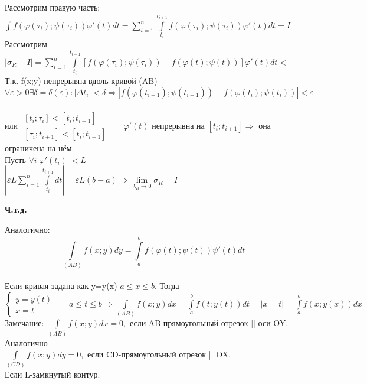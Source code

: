 \documentclass[12pt]{article}
\let\oldint\int
\let\oldsum\sum
\let\oldlim\lim
\renewcommand{\int}{\oldint\limits}
\renewcommand{\sum}{\oldsum\limits}
\renewcommand{\lim}{\oldlim\limits}
\begin{document}
  Рассмотрим правую часть: $\int f(\varphi(\tau_i);\psi(\tau_i))\varphi'(t)dt = \sum_{i=1}^{n}
    \int_{t_i}^{t_{i+1}}f(\varphi(\tau_i);\psi(\tau_i))\varphi'(t)dt=I$\\
  Рассмотрим $|\sigma_R-I|=\sum_{i=1}^{n} \int_{t_i}^{t_{i+1}} [f(\varphi(\tau_i);\psi(\tau_i))-
  f(\varphi(t);\psi(t))]\varphi'(t)dt \boxed{<}$\\
  Т.к. f(x;y) непрерывна вдоль кривой (AB)\\
  \[\forall \varepsilon >0 \exists \delta = \delta(\varepsilon):|\Delta t_i| < \delta \Rightarrow
  |f(\varphi(t_{i+1});\psi(t_{i+1}))-f(\varphi(t_i);\psi(t_i))|<\varepsilon\]\\
  или $\begin{matrix}
    [t_i;\tau_i] <[t_i;t_{i+1}]\\
    [\tau_i;t_{i+1}] < [t_i;t_{i+1}]
  \end{matrix} \hspace{20pt} \varphi'(t)$ непрерывна на $[t_i;t_{i+1}] \Rightarrow$ она ограничена на нём.\\
  Пусть $\forall i |\varphi'(t_i)|<L$\\
  \boxed{<} $|\varepsilon L \sum_{i=1}^{n} \int_{t_i}^{t_{i+1}}dt|=\varepsilon L(b-a)\Rightarrow \lim_{\lambda_R \to 0}\sigma_R=I$
  \begin{center}
    \textbf{Ч.т.д.}
  \end{center}
  Аналогично: \[\int_{(AB)}f(x;y)dy=\int_{a}^{b}f(\varphi(t);\psi(t))\psi'(t)dt\]\\
  Если кривая задана как y=y(x) \hspace{10pt} $a\leq x\leq b$. Тогда\\
  $\begin{cases}
    y=y(t)\\
    x=t
  \end{cases} \hspace{20pt} a\leq t\leq b \Rightarrow \int_{(AB)}f(x;y)dx =\int_{a}^{b} f(t;y(t))dt=
  |x=t|=\int_{a}^{b}f(x;y(x))dx$\\
  \underline{Замечание:} $\int_{(AB)}f(x;y)dx=0,$ если AB-прямоугольный отрезок || оси OY. Аналогично \\
  $\int_{(CD)}f(x;y)dy=0,$ если CD-прямоугольный отрезок || OX.\\
  Если L-замкнутый контур.\\
\end{document}
